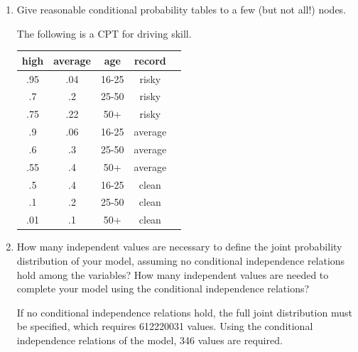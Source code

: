 \documentclass[12pt]{article}
\newenvironment{problem}[2][Problem]{\begin{trivlist}
\item[\hskip \labelsep {\bfseries #1}\hskip \labelsep {\bfseries #2.}]}{\end{trivlist}}
\begin{document}
\begin{problem}{6}
\begin{enumerate}
\begin{figure}[h]
				\label{fig:q6}
			\end{figure}
		\item Give reasonable conditional probability tables to a few (but not all!) nodes.

			The following is a CPT for driving skill.\\
			\begin{tabular}{|c|c|c|c|c|}
				\hline
				high & average & age & record \\
				\hline
				.95 & .04 & 16-25 & risky \\
				.7 & .2 & 25-50 & risky \\
				.75 & .22 & 50+ & risky \\
				.9 & .06 & 16-25 & average \\
				.6 & .3 & 25-50 & average \\
				.55 & .4 & 50+ & average \\
				.5 & .4 & 16-25 & clean \\
				.1 & .2 & 25-50 & clean \\
				.01 & .1 & 50+ & clean \\
				\hline
			\end{tabular}
		\item How many independent values are necessary to define the joint probability distribution of your model, assuming no conditional independence relations hold among the variables? How many independent values are needed to complete your model using the conditional independence relations?

			If no conditional independence relations hold, the full joint distribution must be specified,
			which requires 612220031 values.
			Using the conditional independence relations of the model, 346 values are required.
	\end{enumerate}
\end{problem}
\begin{problem}{7}
\end{problem}
\end{document}
